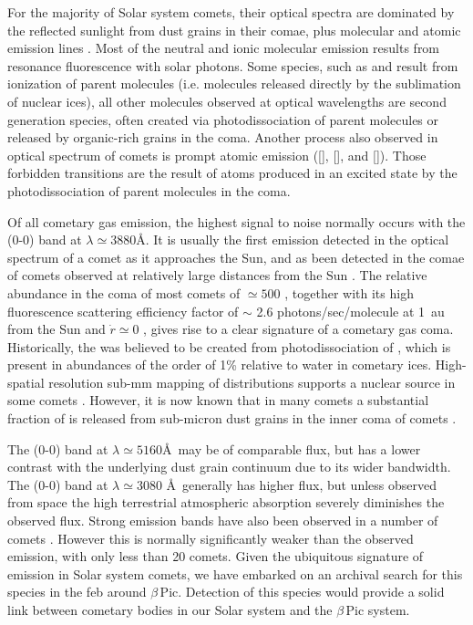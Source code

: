 \documentclass{aa}
\newcommand{\bp}{$\beta$\,Pic}
\begin{document}
For the majority of Solar system comets, their optical spectra are dominated by the reflected sunlight from dust grains in their comae, plus molecular and atomic emission lines \citep[e.g. ][]{hyland2019}.
%
Most of the neutral and ionic molecular emission results from resonance fluorescence with solar photons. Some species, such as  and  result from ionization of parent molecules (i.e. molecules released directly by the sublimation of nuclear ices), all other molecules observed at optical wavelengths are second generation species, often created via photodissociation of parent molecules or released by organic-rich grains in the coma.
%
Another process also observed in optical spectrum of comets is prompt atomic emission  ([], [], and []).
%
Those forbidden transitions are the result of atoms produced in an excited state by the photodissociation of parent molecules in the coma. 

Of all cometary gas emission, the highest signal to noise normally occurs with the  (0-0) band at $\lambda\simeq 3880$\AA.
%
It is usually the first emission detected in the optical spectrum of a comet as it approaches the Sun, and as been detected in the comae of comets observed at relatively large distances from the Sun \citep[e.g. ][]{Bus1991,Fitzsimmons1996}.
%
The relative abundance in the coma of most comets of $\simeq500$ \citep{AHearn1995}, together with its high fluorescence scattering efficiency factor of $\sim$ 2.6 photons/sec/molecule at 1~au from the Sun and $\dot{r}\simeq 0$ \citep{Schleicher2010}, gives rise to a clear signature of a cometary gas coma.
%
Historically, the  was believed to be created from photodissociation of , which is present in abundances of the order of 1\% relative to water in cometary ices.
%
High-spatial resolution sub-mm mapping of  distributions supports a nuclear source in some comets \citep{Cordiner2014}.
%
However, it is now known that in many comets a substantial fraction of  is released from sub-micron dust grains in the inner coma of comets \citep[e.g. ][]{Fray2005}. 

The  (0-0) band at $\lambda\simeq 5160$\AA \ may be of comparable flux, but has a lower contrast with the underlying dust grain continuum due to its wider bandwidth.
%
The  (0-0) band at $\lambda\simeq 3080$ \AA \ generally has higher flux, but unless observed from space the high terrestrial atmospheric absorption severely diminishes the observed flux.
%
Strong  emission bands have also been observed in a number of comets \citep[the strongest ones are the (3-0) and (2-0) $\mathrm{A^2\Pi-X^2\Sigma}$; ][]{Biver2018}.
%
However this is normally significantly weaker than the observed  emission, with only less than 20 comets.
%
Given the ubiquitous signature of  emission in Solar system comets, we have embarked on an archival search for this species in the \ac{feb} around \bp{}.
%
Detection of this species would provide a solid link between cometary bodies in our Solar system and the \bp{} system.
\end{document}
